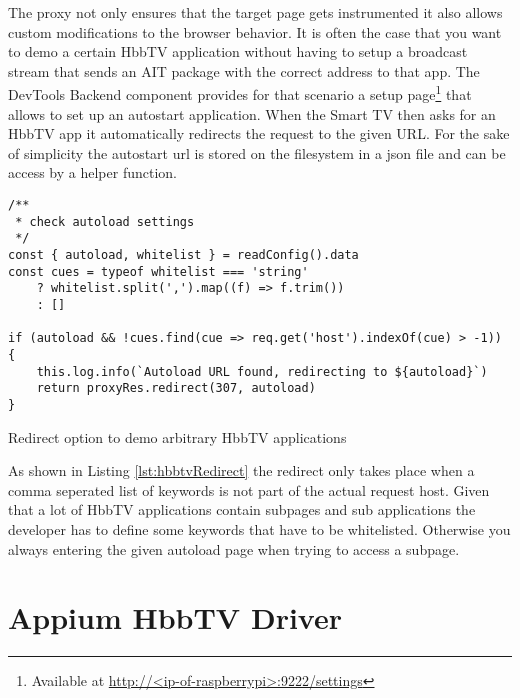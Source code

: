 The proxy not only ensures that the target page gets instrumented it also allows custom modifications to the
browser behavior. It is often the case that you want to demo a certain HbbTV application without having to
setup a broadcast stream that sends an AIT package with the correct address to that app. The DevTools Backend
component provides for that scenario a setup page\footnote{Available at \url{http://<ip-of-raspberrypi>:9222/settings}}
that allows to set up an autostart application. When the Smart TV then asks for an HbbTV app it automatically
redirects the request to the given URL. For the sake of simplicity the autostart url is stored on the filesystem
in a json file and can be access by a helper function.

\begin{listing}[H]
\begin{verbatim}
/**
 * check autoload settings
 */
const { autoload, whitelist } = readConfig().data
const cues = typeof whitelist === 'string'
    ? whitelist.split(',').map((f) => f.trim())
    : []

if (autoload && !cues.find(cue => req.get('host').indexOf(cue) > -1)) {
    this.log.info(`Autoload URL found, redirecting to ${autoload}`)
    return proxyRes.redirect(307, autoload)
}
\end{verbatim}
\caption{Redirect option to demo arbitrary HbbTV applications}
\label{lst:hbbtvRedirect}
\end{listing}

As shown in Listing \ref{lst:hbbtvRedirect} the redirect only takes place when a comma seperated list
of keywords is not part of the actual request host. Given that a lot of HbbTV applications contain subpages
and sub applications the developer has to define some keywords that have to be whitelisted. Otherwise
you always entering the given autoload page when trying to access a subpage.

\section{Appium HbbTV Driver\label{sec:driver}}

